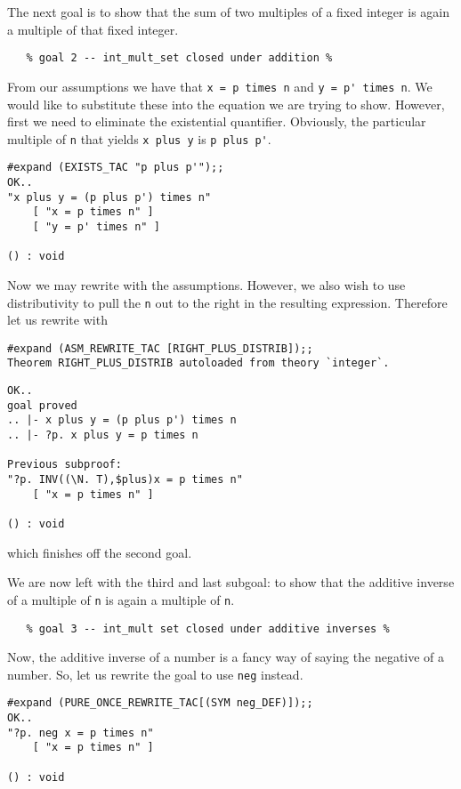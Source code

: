 The next goal is to show that the sum of two multiples of a fixed
integer is again a multiple of that fixed integer.
\begin{verbatim}
   % goal 2 -- int_mult_set closed under addition %
\end{verbatim}
From our assumptions we have that {\small\verb+x = p times n+}
and {\small\verb+y = p' times n+}.  We would like to substitute
these into the equation we are trying to show.  However, first we need
to eliminate the existential quantifier.  Obviously, the particular
multiple of {\small\tt n} that yields {\small\verb+x plus y+} is
{\small\verb+p plus p'+}. 
\begin{session}
\begin{verbatim}
#expand (EXISTS_TAC "p plus p'");;
OK..
"x plus y = (p plus p') times n"
    [ "x = p times n" ]
    [ "y = p' times n" ]

() : void
\end{verbatim}
\end{session}
Now we may rewrite with the assumptions.  However, we also wish to use
distributivity to pull the {\small\tt n} out to the right in the
resulting expression.  Therefore let us rewrite with
\begin{session}
\begin{verbatim}
#expand (ASM_REWRITE_TAC [RIGHT_PLUS_DISTRIB]);;
Theorem RIGHT_PLUS_DISTRIB autoloaded from theory `integer`.
\end{verbatim}
\mvdots
\begin{verbatim}
OK..
goal proved
.. |- x plus y = (p plus p') times n
.. |- ?p. x plus y = p times n

Previous subproof:
"?p. INV((\N. T),$plus)x = p times n"
    [ "x = p times n" ]

() : void
\end{verbatim}
\end{session}
which finishes off the second goal.

We are now left with the third and last subgoal: to show that the
additive inverse of a multiple of {\small\tt n} is again a multiple of
{\small\tt n}. 
\begin{verbatim}
   % goal 3 -- int_mult set closed under additive inverses %
\end{verbatim}
Now, the additive inverse of a number is a fancy way of saying the
negative of a number.  So, let us rewrite the goal to use
{\small\verb+neg+} instead.
\begin{session}
\begin{verbatim}
#expand (PURE_ONCE_REWRITE_TAC[(SYM neg_DEF)]);;
OK..
"?p. neg x = p times n"
    [ "x = p times n" ]

() : void
\end{verbatim}
\end{session}

